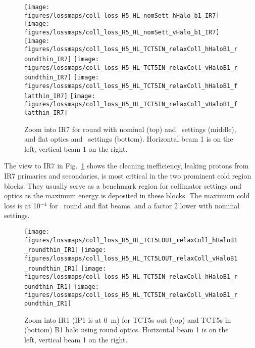 
\begin{figure}[!htb]
\begin{center}
\texttt{[image: figures/lossmaps/coll\_loss\_H5\_HL\_nomSett\_hHalo\_b1\_IR7]}
\texttt{[image: figures/lossmaps/coll\_loss\_H5\_HL\_nomSett\_vHalo\_b1\_IR7]}
\texttt{[image: figures/lossmaps/coll\_loss\_H5\_HL\_TCT5IN\_relaxColl\_hHaloB1\_roundthin\_IR7]}
\texttt{[image: figures/lossmaps/coll\_loss\_H5\_HL\_TCT5IN\_relaxColl\_vHaloB1\_roundthin\_IR7]}
\texttt{[image: figures/lossmaps/coll\_loss\_H5\_HL\_TCT5IN\_relaxColl\_hHaloB1\_flatthin\_IR7]}
\texttt{[image: figures/lossmaps/coll\_loss\_H5\_HL\_TCT5IN\_relaxColl\_vHaloB1\_flatthin\_IR7]}
\end{center}
\vspace{-0.3cm}
 \caption{Zoom into IR7 for round with nominal (top) and \twosigmaret~settings (middle), and flat optics and \twosigmaret~settings (bottom). Horizontal beam 1 is on the left, vertical beam 1 on the right.
  \label{IR7_zooms}}
\end{figure}

The view to IR7 in Fig.~\ref{IR7_zooms} shows the cleaning inefficiency, leaking protons from IR7 primaries and secondaries, is most critical in the two prominent cold region blocks. They usually serve as a benchmark region for collimator settings and optics as the maximum energy is deposited in these blocks. The maximum cold loss is at 10$^{-4}$ for \twosigmaret~round and flat beams, and a factor 2 lower with nominal settings.

\begin{figure}[!tb]
\begin{center}
\texttt{[image: figures/lossmaps/coll\_loss\_H5\_HL\_TCT5LOUT\_relaxColl\_hHaloB1\_roundthin\_IR1]}
\texttt{[image: figures/lossmaps/coll\_loss\_H5\_HL\_TCT5LOUT\_relaxColl\_vHaloB1\_roundthin\_IR1]}
\texttt{[image: figures/lossmaps/coll\_loss\_H5\_HL\_TCT5IN\_relaxColl\_hHaloB1\_roundthin\_IR1]}
\texttt{[image: figures/lossmaps/coll\_loss\_H5\_HL\_TCT5IN\_relaxColl\_vHaloB1\_roundthin\_IR1]}
\end{center}
\vspace{-0.3cm}
 \caption{Zoom into IR1 (IP1 is at 0~m) for TCT5s out (top) and TCT5s in (bottom) B1 halo using round optics. Horizontal beam 1 is on the left, vertical beam 1 on the right.
  \label{IR1_roundB1}}
\end{figure}

